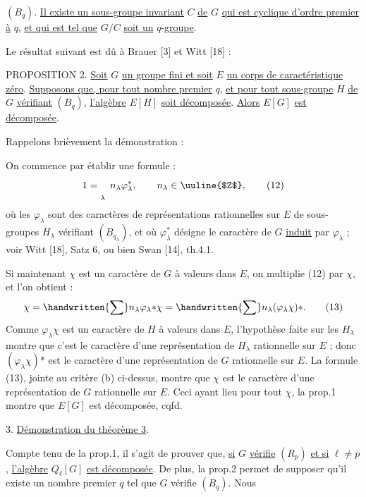 $(B_q)$. \uline{Il existe un sous-groupe invariant} $C$ \uline{de} $G$ \uline{qui est cyclique d'ordre premier à} $q$, \uline{et qui est tel que} $G/C$ \uline{soit un} $q$-\uline{groupe}.

Le résultat suivant est dû à Brauer [3] et Witt [18] :

PROPOSITION 2. \uline{Soit} $G$ \uline{un groupe fini et soit} $E$ \uline{un corps de caractéristique zéro}. \uline{Supposons que, pour tout nombre premier} $q$, \uline{et pour tout sous-groupe} $H$ \uline{de} $G$ \uline{vérifiant} $(B_q)$, \uline{l'algèbre} $E[H]$ \uline{soit décomposée}. \uline{Alors} $E[G]$ \uline{est décomposée}.

Rappelons brièvement la démonstration :

On commence par établir une formule :
\[
\csname tagsleft@true\endcsname
1=\mathop{\vphantom{\sum}}\limits_{\lambda}\ n_\lambda\varphi_\lambda^*,\qquad n_\lambda\in\text{\uuline{$Z$}},\tag*{(12)}
\]
où les $\varphi_\lambda$ sont des caractères de représentations rationnelles sur $E$ de sous-groupes $H_\lambda$ vérifiant $(B_{q_\lambda})$, et où $\varphi_\lambda^*$ désigne le caractère de $G$ \uline{induit} par $\varphi_\lambda$ ; voir Witt [18], Satz 6, ou bien Swan [14], th.4.1.

Si maintenant $\chi$ est un caractère de $G$ à valeurs dans $E$, on multiplie (12) par $\chi$, et l'on obtient :
\[
\csname tagsleft@true\endcsname
\chi=\handwritten{\sum}n_\lambda\varphi_\lambda\mathord{*}\chi
=\handwritten{\sum}n_\lambda(\varphi_\lambda\chi)\mathord{*}.\tag*{(13)}
\]
Comme $\varphi_\lambda\chi$ est un caractère de $H$ à valeurs dans $E$, l'hypothèse faite sur les $H_\lambda$ montre que c'est le caractère d'une représentation de $H_\lambda$ rationnelle sur $E$ ; donc $(\varphi_\lambda\chi)\mathord{*}$ est le caractère d'une représentation de $G$ rationnelle sur $E$. La formule (13), jointe au critère (b) ci-dessus, montre que $\chi$ est le caractère d'une représentation de $G$ rationnelle sur $E$. Ceci ayant lieu pour tout $\chi$, la prop.1 montre que $E[G]$ est décomposée, cqfd.

3. \uline{Démonstration du théorème 3}.

Compte tenu de la prop.1, il s'agit de prouver que, \uline{si} $G$ \uline{vérifie} $(R_p)$ \uline{et si} $\ell\ne p$, \uline{l'algèbre} $Q_\ell[G]$ \uline{est décomposée}. De plus, la prop.2 permet de supposer qu'il existe un nombre premier $q$ tel que $G$ vérifie $(B_q)$. Nous
